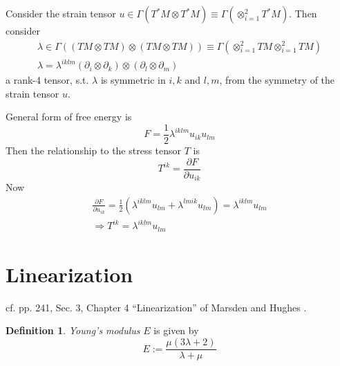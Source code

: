 \documentclass[twoside,landscape,10pt]{amsart}
\theoremstyle{plain}
\theoremstyle{definition}
\newtheorem{definition}{Definition}
\theoremstyle{remark}
\begin{document}
\begin{multicols*}{2}
Consider the strain tensor $u \in \Gamma(T^*M \otimes T^*M) \equiv \Gamma( \otimes_{i=1}^2 T^*M)$.  Then consider
\[
\begin{gathered}
\lambda \in \Gamma( (TM \otimes TM) \otimes (TM \otimes TM) ) \equiv \Gamma( \otimes_{i=1}^2TM \otimes_{i=1}^2TM) \\
\lambda = \lambda^{iklm} (\partial_i \otimes \partial_k)\otimes (\partial_l \otimes \partial_m)
\end{gathered}
\]
a rank-4 tensor, s.t. $\lambda$ is symmetric in $i,k$ and $l,m$, from the symmetry of the strain tensor $u$.  


General form of free energy is 
\[
F = \frac{1}{2} \lambda^{iklm} u_{ik} u_{lm}
\] 
Then the relationship to the stress tensor $T$ is
\[
T^{ik} = \frac{ \partial F}{ \partial u_{ik}} 
\]
Now
\[
\begin{gathered}
  \frac{ \partial F}{ \partial u_{ik}} = \frac{1}{2} ( \lambda^{iklm}u_{lm} + \lambda^{lmik}u_{lm}) = \lambda^{iklm} u_{lm} \\
  \Longrightarrow T^{ik} = \lambda^{iklm}u_{lm}
\end{gathered}
\]




\section{Linearization}

cf. pp. 241, Sec. 3, Chapter 4 ``Linearization'' of Marsden and Hughes \cite{JMarsdenTHughes1994}.  

\begin{definition}\label{Def:Youngsmodulus}
  \emph{Young's modulus} $E$ is given by 
\begin{equation}
  E := \frac{ \mu (3 \lambda + 2 )}{ \lambda + \mu }
\end{equation}
\end{definition}


\end{multicols*}
\end{document}
